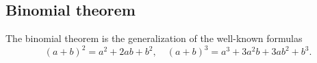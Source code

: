 

\setcounter{section}{3}
\setcounter{subsection}{4}
\setcounter{dfn}{6}

\subsection{Binomial theorem}
The binomial theorem is the generalization of the well-known formulas
\[
(a+b)^2 = a^2 + 2ab + b^2, \quad (a+b)^3 = a^3 + 3a^2b + 3ab^2 + b^3.
\]


